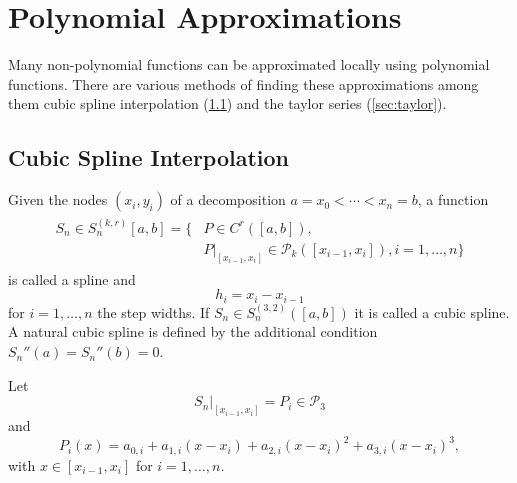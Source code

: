 \documentclass[a4paper, 11pt]{memoir}
\begin{document}
    \section{Polynomial Approximations}
    \label{sec:poly_approx}
    Many non-polynomial functions can be approximated locally using polynomial functions. There are various methods of
    finding these approximations among them cubic spline interpolation (\ref{sec:cubic_spline}) and the taylor series
    (\ref{sec:taylor}).

    \subsection{Cubic Spline Interpolation}
    \label{sec:cubic_spline}
    Given the nodes $(x_i, y_i)$ of a decomposition $a = x_0 < \cdots < x_n = b$, a function
    \begin{align}
        \begin{aligned}
            S_n \in S_n^{(k, r)}[a, b] = \{ &P \in C^r([a, b]),\\&P|_{[x_{i - 1}, x_i]} \in \mathcal{P}_k([x_{i - 1}, x_i]), i=1,\dots,n \}
        \end{aligned}
    \end{align}
    is called a spline and
    \begin{equation}
        h_i = x_i - x_{i-1}
    \end{equation}
    for $i=1,\dots,n$ the step widths. If $S_n \in S_n^{(3, 2)}([a, b])$ it is called a cubic spline. A natural cubic spline is defined by
    the additional condition $S_n''(a) = S_n''(b) = 0$.

    Let
    \begin{equation}
        S_n|_{[x_{i-1}, x_i]} = P_i \in \mathcal{P}_3
    \end{equation}
    and
    \begin{equation}
        P_i(x) = a_{0,i} + a_{1,i}(x - x_i) + a_{2,i}(x - x_i)^2 + a_{3,i}(x - x_i)^3,
    \end{equation}
    with $x\in[x_{i-1}, x_i]$ for $i=1,\dots,n$.
\end{document}
